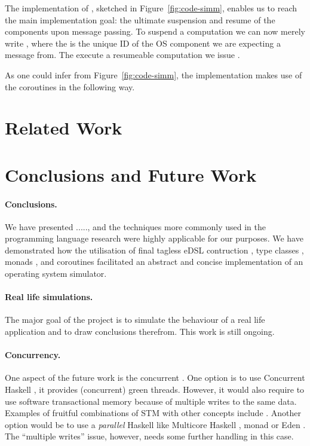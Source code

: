 The implementation of , sketched in
Figure~\ref{fig:code-simm}, enables us to reach the main
implementation goal: the ultimate suspension and resume of the
components upon message passing.  To suspend a computation we can now
merely write , where the  is
the unique ID of the OS component we are expecting a message from. The
execute a resumeable computation we issue .

As one could infer from Figure~\ref{fig:code-simm}, the implementation
makes use of the coroutines in the following way. 


\section{Related Work}
\label{sec:related-work}


\section{Conclusions and Future Work}
\label{sec:concl-future-work}

\paragraph{Conclusions.}  We have
presented ....., and the techniques more commonly used in the
programming language research were highly applicable for our
purposes. We have demonstrated how the utilisation of final tagless
eDSL contruction \cite{...}, type classes \cite{...}, monads
\cite{...}, and coroutines \cite{...} facilitated an abstract and
concise implementation of an operating system simulator.

\paragraph{Real life simulations.} The major goal of the project is to
simulate the behaviour of a real life application and to draw
conclusions therefrom. This work is still ongoing.

\paragraph{Concurrency.} One aspect of the future work is the
concurrent \soosim. One option is to use Concurrent Haskell
\cite{ConcHs}, it provides (concurrent) green threads. However, it
would also require to use software transactional memory
\cite{springerlink:10.1007/s004460050028} because of multiple writes
to the same data. Examples of fruitful combinations of STM with other
concepts include
\cite{Harris:2008:CMT:1378704.1378725,Bieniusa:2010:BAA:1835698.1835714}.
Another option would be to use a \emph{parallel} Haskell like
Multicore Haskell \cite{marlow:rsm},  monad \cite{par-monad}
or Eden \cite{eden}. The ``multiple writes'' issue, however, needs
some further handling in this case.

